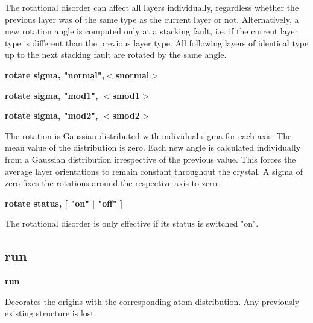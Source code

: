 \par
\vspace{3pt}
The rotational disorder can affect all layers individually, regardless 
whether the previous layer was of the same type as the current layer or 
not. 
Alternatively, a new rotation angle is computed only at a stacking fault, 
i.e. if the current layer type is different than the previous layer type. 
All following layers of identical type up to the next stacking fault are 
rotated by the same angle. 
\par
{\bf rotate sigma, "normal",$ <$snormal$> $ \par }
{\bf rotate sigma, "mod1",  $ <$smod1$> $ \par }
{\bf rotate sigma, "mod2",  $ <$smod2$> $ \par }
\par
\vspace{3pt}
The rotation is Gaussian distributed with individual sigma for each axis. 
The mean value of the distribution is zero. Each new angle is calculated 
individually from a Gaussian distribution irrespective of the previous 
value. This forces the average layer orientations to remain constant 
throughout the crystal. 
A sigma of zero fixes the rotations around the respective axis to zero. 
\par
{\bf rotate status,  [ "on" $| $ "off" ] \par }
\par
\vspace{3pt}
The rotational disorder is only effective if its status is switched "on". 
\subsection*{run}
{\bf run \par }
\par
\vspace{3pt}
Decorates the origins with the corresponding atom distribution. Any 
previously existing structure is lost. 
